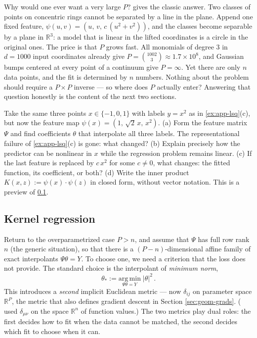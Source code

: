 \documentclass[11pt]{article}
\newcommand{\R}{\mathbb{R}}
\begin{document}
Why would one ever want a very large $P$?  gives the classic answer. Two classes of points on concentric rings cannot be separated by a line in the plane. Append one fixed feature, $\psi(u,v) = (u,\,v,\,c\,(u^2+v^2))$, and the classes become separable by a plane in $\R^3$: a model that is linear in the lifted coordinates is a circle in the original ones. The price is that $P$ grows fast. All monomials of degree $3$ in $d=1000$ input coordinates already give $P = \binom{1002}{3} \approx 1.7\times 10^8$, and Gaussian bumps centered at every point of a continuum give $P=\infty$. Yet there are only $n$ data points, and the fit is determined by $n$ numbers. Nothing about the problem should require a $P\times P$ inverse --- so where does $P$ actually enter? Answering that question honestly is the content of the next two sections.

\begin{exercise}
\label{ex:app-features}
Take the same three points $x\in\{-1,0,1\}$ with labels $y=x^2$ as in \cref{ex:app-lsq}(c), but now the feature map $\psi(x) = (1,\,\sqrt2\,x,\,x^2)$.
(a) Form the feature matrix $\Psi$ and find coefficients $\theta$ that interpolate all three labels. The representational failure of \cref{ex:app-lsq}(c) is gone: what changed?
(b) Explain precisely how the predictor can be nonlinear in $x$ while the regression problem remains linear.
(c) If the last feature is replaced by $c\,x^2$ for some $c\neq 0$, what changes: the fitted function, its coefficient, or both?
(d) Write the inner product $K(x,z) := \psi(x)\cdot\psi(z)$ in closed form, without vector notation. This is a preview of \cref{app:kernel}.
\end{exercise}

\subsection{Kernel regression}
\label{app:kernel}

Return to the overparametrized case $P>n$, and assume that $\Psi$ has full row rank $n$ (the generic situation), so that there is a $(P-n)$-dimensional affine family of exact interpolants $\Psi\theta = Y$. To choose one, we need a criterion that the loss does not provide. The standard choice is the interpolant of \emph{minimum norm},
%
\begin{equation}
    \theta_* := \underset{\Psi\theta = Y}{\mathrm{arg\,min}}\; |\theta|^2\,. \label{app-minnorm}
\end{equation}
%
This introduces a \emph{second} implicit Euclidean metric --- now $\delta_{ij}$ on parameter space $\R^P$, the metric that also defines gradient descent in Section \ref{sec:geom-grads}. ( used $\delta_{\mu\nu}$ on the space $\R^n$ of function values.) The two metrics play dual roles: the first decides how to fit when the data cannot be matched, the second decides which fit to choose when it can.
\end{document}

